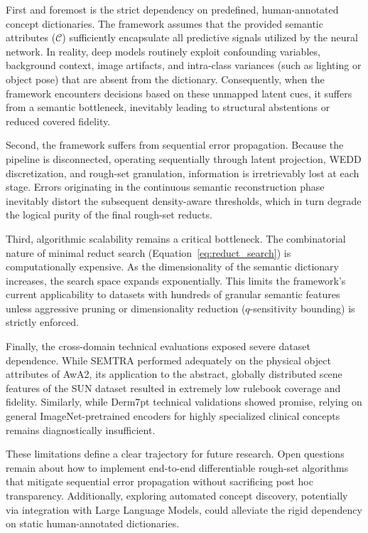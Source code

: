 \documentclass[make,article,submit,pdftex,moreauthors]{Definitions/mdpi}
\begin{document}
First and foremost is the strict dependency on predefined, human-annotated concept dictionaries. The framework assumes that the provided semantic attributes ($\mathcal{C}$) sufficiently encapsulate all predictive signals utilized by the neural network. In reality, deep models routinely exploit confounding variables, background context, image artifacts, and intra-class variances (such as lighting or object pose) that are absent from the dictionary. Consequently, when the framework encounters decisions based on these unmapped latent cues, it suffers from a semantic bottleneck, inevitably leading to structural abstentions or reduced covered fidelity. 

Second, the framework suffers from sequential error propagation. Because the pipeline is disconnected, operating sequentially through latent projection, WEDD discretization, and rough-set granulation, information is irretrievably lost at each stage. Errors originating in the continuous semantic reconstruction phase inevitably distort the subsequent density-aware thresholds, which in turn degrade the logical purity of the final rough-set reducts. 

Third, algorithmic scalability remains a critical bottleneck. The combinatorial nature of minimal reduct search (Equation~\eqref{eq:reduct_search}) is computationally expensive. As the dimensionality of the semantic dictionary increases, the search space expands exponentially. This limits the framework's current applicability to datasets with hundreds of granular semantic features unless aggressive pruning or dimensionality reduction ($q$-sensitivity bounding) is strictly enforced.

Finally, the cross-domain technical evaluations exposed severe dataset dependence. While SEMTRA performed adequately on the physical object attributes of AwA2, its application to the abstract, globally distributed scene features of the SUN dataset resulted in extremely low rulebook coverage and fidelity. Similarly, while Derm7pt technical validations showed promise, relying on general ImageNet-pretrained encoders for highly specialized clinical concepts remains diagnostically insufficient.

These limitations define a clear trajectory for future research. Open questions remain about how to implement end-to-end differentiable rough-set algorithms that mitigate sequential error propagation without sacrificing post hoc transparency. Additionally, exploring automated concept discovery, potentially via integration with Large Language Models, could alleviate the rigid dependency on static human-annotated dictionaries.
\end{document}
